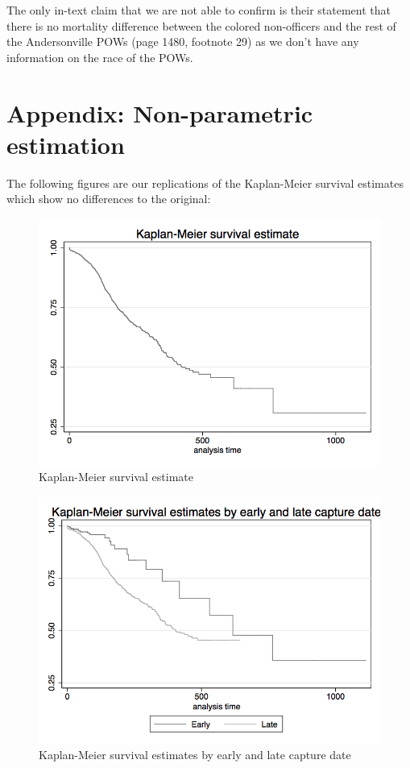 \documentclass[a4paper]{report}\usepackage{graphicx, color}
\begin{document}
\begin{refsection}
The only in-text claim that we are not able to confirm is their statement that there is no mortality difference between the colored non-officers and the rest of the Andersonville POWs (page 1480, footnote 29) as we don’t have any information on the race of the POWs.

\section*{Appendix: Non-parametric estimation}
The following figures are our replications of the Kaplan-Meier survival estimates which show no differences to the original:

\begin{figure}
\centering
\caption{Kaplan-Meier survival estimate}
\label{kmSurvival}
\includegraphics[scale=0.3]{kaplan1.png}
\end{figure}

\begin{figure}
\centering
\caption{Kaplan-Meier survival estimates by early and late capture date}
\label{kmCapture}
\includegraphics[scale=0.3]{kaplan2.png}
\end{figure}


\end{refsection}
\end{document}
